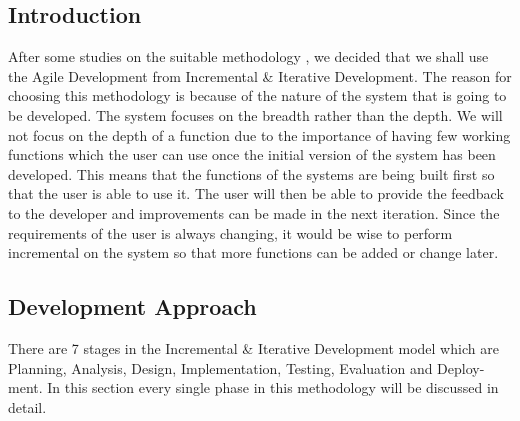 \documentclass{article}
\begin{document}
\subsection{Introduction}
After some studies on the suitable methodology , we decided that we shall use
the Agile Development from Incremental \& Iterative Development. The reason
for choosing this methodology is because of the nature of the system that is
going to be developed. The system focuses on the breadth rather than the
depth. We will not focus on the depth of a function due to the importance of
having few working functions which the user can use once the initial version of
the system has been developed. This means that the functions of the systems
are being built first so that the user is able to use it. The user will then be able
to provide the feedback to the developer and improvements can be made in the
next iteration. Since the requirements of the user is always
changing, it would be wise to perform incremental on the system so that more
functions can be added or change later.
\subsection{Development Approach}
There are 7 stages in the Incremental \& Iterative Development model which are
Planning, Analysis, Design, Implementation, Testing, Evaluation and Deploy-
ment. In this section every single phase in this methodology
will be discussed in detail.
\end{document}
